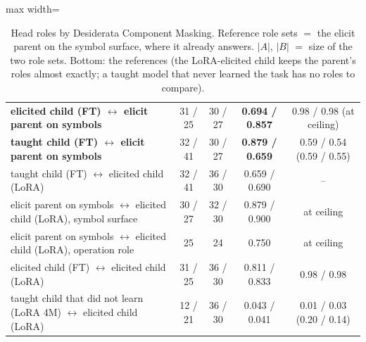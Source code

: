 \documentclass[11pt]{article}
\begin{document}
\begin{enumerate}[label=\textbf{M\arabic*}, leftmargin=*, itemsep=1.2em, resume]
\begin{table}[h]
\begin{adjustbox}{max width=\textwidth}
\begin{tabular}{lcccc}
\midrule
\textbf{elicited child (FT) $\leftrightarrow$ elicit parent on symbols} & 31 / 25 & 30 / 27 & \textbf{0.694 / 0.857} & 0.98 / 0.98 (at ceiling) \\
\textbf{taught child (FT) $\leftrightarrow$ elicit parent on symbols} & 32 / 41 & 30 / 27 & \textbf{0.879 / 0.659} & 0.59 / 0.54 (0.59 / 0.55) \\
taught child (FT) $\leftrightarrow$ elicited child (LoRA) & 32 / 41 & 36 / 30 & 0.659 / 0.690 & -- \\
\midrule
elicit parent on symbols $\leftrightarrow$ elicited child (LoRA), symbol surface & 30 / 27 & 32 / 30 & 0.879 / 0.900 & at ceiling \\
elicit parent on symbols $\leftrightarrow$ elicited child (LoRA), operation role & 25 & 24 & 0.750 & at ceiling \\
elicited child (FT) $\leftrightarrow$ elicited child (LoRA) & 31 / 25 & 36 / 30 & 0.811 / 0.833 & 0.98 / 0.98 \\
taught child that did not learn (LoRA 4M) $\leftrightarrow$ elicited child (LoRA) & 12 / 21 & 36 / 30 & 0.043 / 0.041 & 0.01 / 0.03 (0.20 / 0.14) \\
\bottomrule
\end{tabular}
\end{adjustbox}
\caption{Head roles by Desiderata Component Masking. Reference role sets $=$ the elicit parent
on the symbol surface, where it already answers. $|A|$, $|B|$ $=$ size of the two role sets. Bottom: the
references (the LoRA-elicited child keeps the parent's roles almost exactly; a taught model that
never learned the task has no roles to compare).}
\label{tab:dcm}
\end{table}



\end{enumerate}
\end{document}
